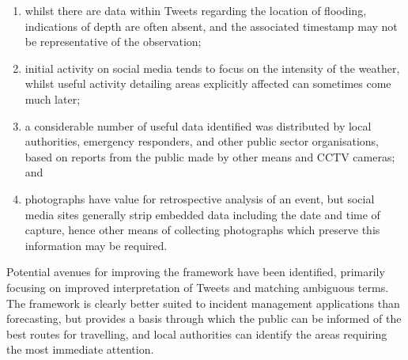 \begin{enumerate}
	\item whilst there are data within Tweets regarding the location of flooding, indications of depth are often absent, and the associated timestamp may not be representative of the observation;
	\item initial activity on social media tends to focus on the intensity of the weather, whilst useful activity detailing areas explicitly affected can sometimes come much later;
	\item a considerable number of useful data identified was distributed by local authorities, emergency responders, and other public sector organisations, based on reports from the public made by other means and CCTV cameras; and
	\item photographs have value for retrospective analysis of an event, but social media sites generally strip embedded data including the date and time of capture, hence other means of collecting photographs which preserve this information may be required.
\end{enumerate}

Potential avenues for improving the framework have been identified, primarily focusing on improved interpretation of Tweets and matching ambiguous terms. The framework is clearly better suited to incident management applications than forecasting, but provides a basis through which the public can be informed of the best routes for travelling, and local authorities can identify the areas requiring the most immediate attention. 